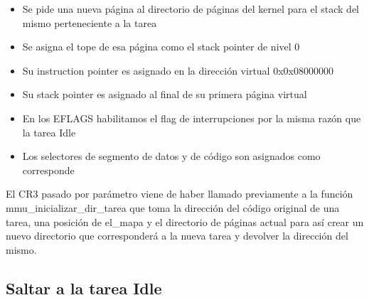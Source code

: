 \begin{itemize}
	\item Se pide una nueva página al directorio de páginas del kernel para el stack del mismo perteneciente a la tarea
	\item Se asigna el tope de esa página como el stack pointer de nivel 0
	\item Su instruction pointer es asignado en la dirección virtual 0x0x08000000
	\item Su stack pointer es asignado al final de su primera página virtual
	\item En los EFLAGS habilitamos el flag de interrupciones por la misma razón que la tarea Idle
	\item Los selectores de segmento de datos y de código son asignados como corresponde
\end{itemize}

El CR3 pasado por parámetro viene de haber llamado previamente a la función mmu_inicializar_dir_tarea que toma la dirección del código original de una tarea, una posición de el_mapa y el directorio de páginas actual para así crear un nuevo directorio que corresponderá a la nueva tarea y devolver la dirección del mismo.

\subsection{Saltar a la tarea Idle}


